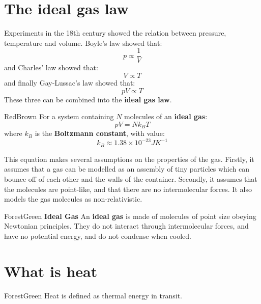 \documentclass[a4paper,11pt,oneside]{book}
\begin{document}
\section{The ideal gas law}
Experiments in the 18th century showed the relation between pressure, temperature and volume. 
Boyle's law showed that:
\begin{equation}
    p \propto \frac{1}{V}
\end{equation}
and Charles' law showed that:
\begin{equation}
    V \propto T
\end{equation}
and finally Gay-Lussac's law showed that:
\begin{equation}
    pV \propto T
\end{equation}
These three can be combined into the \textbf{ideal gas law}. 
\begin{mybox}{RedBrown}{\textbf{}}
For a system containing $N$ molecules of an \textbf{ideal gas}:
\begin{equation}
pV=Nk_B T    
\end{equation}
where $k_B$ is the \textbf{Boltzmann constant}, with value:
\begin{equation}
    k_B \approx 1.38 \times 10^{-23} J K^{-1}
\end{equation}
\end{mybox}
This equation makes several assumptions on the properties of the gas. Firstly, it assumes that a gas can be modelled as an assembly of tiny particles which can bounce off of each other and the walls of the container. Secondly, it assumes that the molecules are point-like, and that there are no intermolecular forces. It also models the gas molecules as non-relativistic. 

\begin{mybox}{ForestGreen}{\textbf{ Ideal Gas}}
An \textbf{ideal gas} is made of molecules of point size obeying Newtonian principles. They do not interact through intermolecular forces, and have no potential energy, and do not condense when cooled. 
\end{mybox}
\section{What is heat}
\begin{mybox}{ForestGreen}{\textbf{}}
Heat is defined as thermal energy in transit. 
\end{mybox}
\end{document}
